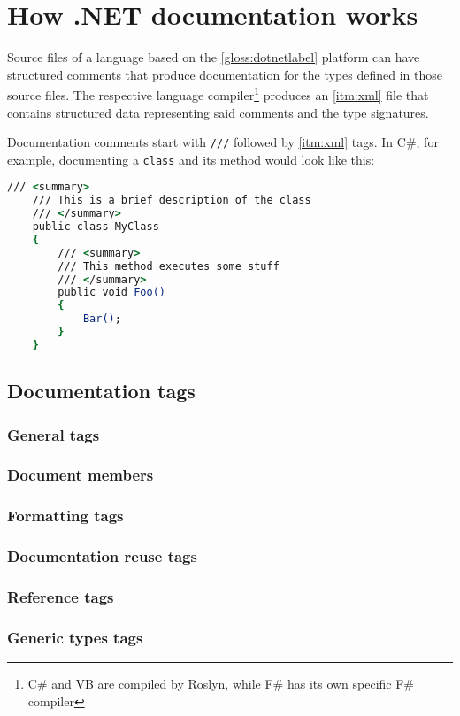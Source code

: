 \chapter{How .NET documentation works}

Source files of a language based on the \ref{gloss:dotnetlabel} platform can have structured comments that produce documentation for the types defined in those source files. The respective language compiler\footnote{C\# and VB are compiled by Roslyn, while F\# has its own specific F\# compiler} produces an \ref{itm:xml} file that contains structured data representing said comments and the type signatures.
\cite{wagner_xml_2022}

Documentation comments start with \lstinline[language=csh]{///} followed by \ref{itm:xml} tags. In C\#, for example, documenting a \lstinline[language=csh]{class} and its method would look like this:
\begin{lstlisting}[language=csh]
    /// <summary>
    /// This is a brief description of the class
    /// </summary>
    public class MyClass
    {
        /// <summary>
        /// This method executes some stuff
        /// </summary>
        public void Foo()
        {
            Bar();
        }
    }
\end{lstlisting}

\section{Documentation tags}
\subsection{General tags}
\subsection{Document members}
\subsection{Formatting tags}
\subsection{Documentation reuse tags}
\subsection{Reference tags}
\subsection{Generic types tags}
